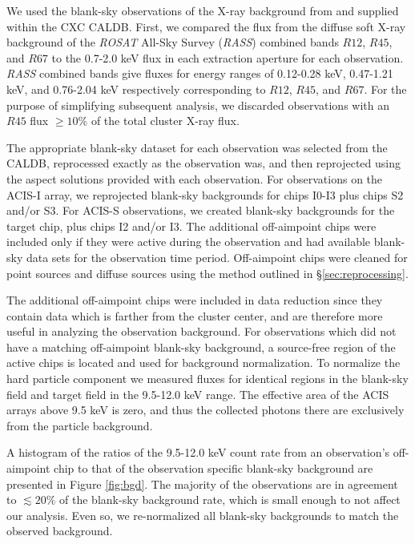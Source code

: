 \documentclass[12pt,preprint]{aastex}
\begin{document}
We used the blank-sky observations of the X-ray background from
\cite{2001ApJ...562L.153M} and supplied within the CXC
{\textsc{CALDB}}. First, we compared the flux from the diffuse soft
X-ray background of the {\it{ROSAT}} All-Sky Survey ({\it RASS})
combined bands $R12$, $R45$, and $R67$ to the 0.7-2.0 keV flux in each
extraction aperture for each observation. {\it RASS} combined bands
give fluxes for energy ranges of 0.12-0.28 keV, 0.47-1.21 keV, and
0.76-2.04 keV respectively corresponding to $R12$, $R45$, and $R67$. For
the purpose of simplifying subsequent analysis, we discarded
observations with an $R45$ flux $\geq 10\%$ of the total cluster X-ray
flux.

The appropriate blank-sky dataset for each observation was
selected from the {\textsc{CALDB}}, reprocessed exactly as the
observation was, and then reprojected using the aspect solutions provided
with each observation. For observations on the ACIS-I array, we
reprojected blank-sky backgrounds for chips I0-I3 plus chips S2 and/or
S3. For ACIS-S observations, we created blank-sky backgrounds for
the target chip, plus chips I2 and/or I3. The additional off-aimpoint
chips were included only if they were active during the observation
and had available blank-sky data sets for the observation time
period. Off-aimpoint chips were cleaned for point sources and diffuse
sources using the method outlined in \S\ref{sec:reprocessing}.

The additional off-aimpoint chips were included in data reduction
since they contain data which is farther from the cluster center, and
are therefore more useful in analyzing the observation background. For
observations which did not have a matching off-aimpoint blank-sky
background, a source-free region of the active chips is
located and used for background normalization. To normalize the hard
particle component we measured fluxes for identical regions in the
blank-sky field and target field in the 9.5-12.0 keV range. The
effective area of the ACIS arrays above 9.5 keV is zero, and thus the
collected photons there are exclusively from the particle background.

A histogram of the ratios of the 9.5-12.0 keV count rate from an
observation's off-aimpoint chip to that of the observation specific
blank-sky background are presented in Figure \ref{fig:bgd}. The
majority of the observations are in agreement to $\lesssim 20\%$ of
the blank-sky background rate, which is small enough to not affect our
analysis. Even so, we re-normalized all blank-sky backgrounds to match
the observed background.
\end{document}
